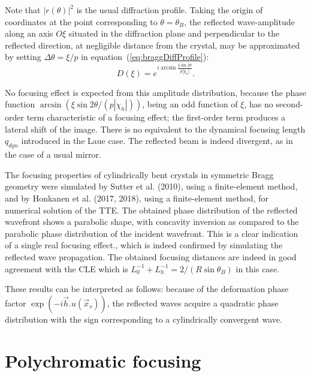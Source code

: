 \documentclass[preprint]{iucr}              %
\newcommand{\inred}[1]{{\color{red}#1}}
\begin{document}
Note that $|r(\theta)|^2$ is the usual \inred{diffraction profile}. Taking the origin of coordinates at the point corresponding to $\theta=\theta_B$, the reflected wave-amplitude along an axis $O\xi$ situated in the diffraction plane and perpendicular to the reflected direction, at negligible distance from the crystal, may be approximated by setting  $\Delta\theta=\xi/p$ in equation~(\ref{eq:braggDiffProfile}):
\begin{equation}
    D(\xi) = e^{i \arcsin{\frac{\xi \sin2\theta}{p |\chi_h|}}}.
\end{equation}

No focusing effect is expected from this amplitude distribution, because the phase function $\arcsin(\xi \sin2\theta/ (p |\chi_h|))$, being an odd function of $\xi$, has no second-order term characteristic of a focusing effect; the first-order term produces a lateral shift of the image. There is no equivalent to the dynamical focusing length $q_{dyn}$ introduced in the Laue case. The reflected beam is indeed divergent, as in the case of a usual mirror.

The focusing properties of cylindrically bent crystals in symmetric Bragg geometry were simulated by Sutter et al. (2010), using a finite-element method, and by Honkanen et al. (2017, 2018), using a finite-element method, for numerical solution of the TTE. The obtained phase distribution of the reflected wavefront shows a parabolic shape, with concavity inversion as compared to the parabolic phase distribution of the incident wavefront. This is a clear indication of a single real focusing effect., which is indeed confirmed by simulating the reflected wave propagation. The obtained focusing distances are indeed in good agreement with the CLE which is $L_0^{-1}+L_h^{-1}=2/(R \sin\theta_B)$ in this case.

These results can be interpreted as follows: because of the deformation phase factor $\exp(-i\vec h. u(\vec x_s))$, the reflected waves acquire a quadratic phase distribution with the sign corresponding to a cylindrically convergent wave.



\section{Polychromatic focusing}
\label{sec:polychromatic}
\end{document}
